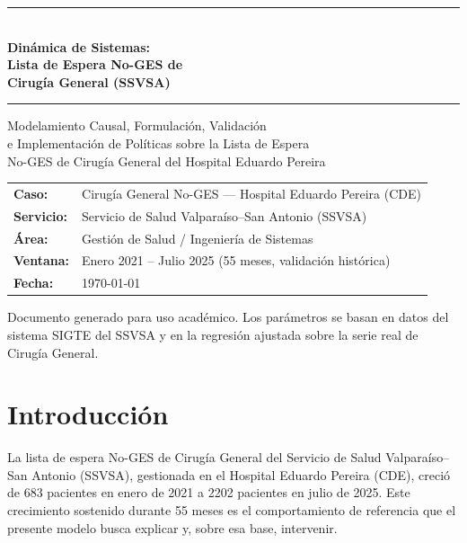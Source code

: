 \documentclass[12pt,a4paper]{article}
\begin{document}
\begin{titlepage}
\centering
\vspace*{1cm}
{\color{azulDS}\rule{\linewidth}{1.5pt}}\\[0.8em]
{\LARGE\bfseries Dinámica de Sistemas:\\[0.3em]
Lista de Espera No-GES de\\[0.3em]
Cirugía General (SSVSA)}\\[0.6em]
{\color{azulDS}\rule{\linewidth}{1.5pt}}

\vspace{2cm}
{\large Modelamiento Causal, Formulación, Validación\\
e Implementación de Políticas sobre la Lista de Espera\\
No-GES de Cirugía General del Hospital Eduardo Pereira}

\vspace{3cm}
\begin{tabular}{ll}
\textbf{Caso:}     & Cirugía General No-GES — Hospital Eduardo Pereira (CDE) \\[4pt]
\textbf{Servicio:} & Servicio de Salud Valparaíso--San Antonio (SSVSA) \\[4pt]
\textbf{Área:}     & Gestión de Salud / Ingeniería de Sistemas \\[4pt]
\textbf{Ventana:}  & Enero 2021 -- Julio 2025 (55 meses, validación histórica) \\[4pt]
\textbf{Fecha:}    & \today \\
\end{tabular}

\vfill
{\small\textcolor{grisOscuro}{Documento generado para uso académico.
Los parámetros se basan en datos del sistema SIGTE del SSVSA
y en la regresión ajustada sobre la serie real de Cirugía General.}}
\end{titlepage}

\tableofcontents
\newpage

\section{Introducción}

La lista de espera No-GES de Cirugía General del Servicio de Salud Valparaíso--San Antonio (SSVSA), gestionada en el Hospital Eduardo Pereira (CDE), creció de 683 pacientes en enero de 2021 a 2202 pacientes en julio de 2025. Este crecimiento sostenido durante 55 meses es el comportamiento de referencia que el presente modelo busca explicar y, sobre esa base, intervenir.
\end{document}
